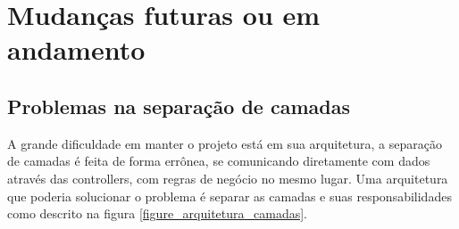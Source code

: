 \documentclass[
	article,			%
	11pt,				%
	oneside,			%
	a4paper,			%
	english,			%
	brazil,				%
	sumario=tradicional
	]{abntex2}
\begin{document}
\section{Mudanças futuras ou em andamento}

\subsection{Problemas na separação de camadas}

A grande dificuldade em manter o projeto está em sua arquitetura, a separação de camadas é feita de forma errônea, se comunicando diretamente com dados através das controllers, com regras de negócio no mesmo lugar.
Uma arquitetura que poderia solucionar o problema é separar as camadas e suas responsabilidades como descrito na figura \ref{figure_arquitetura_camadas}.
\end{document}
